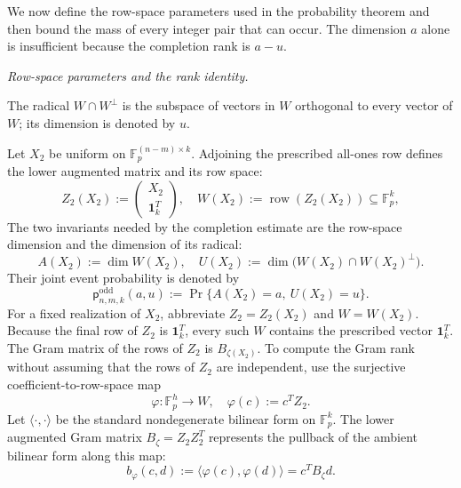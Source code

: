\documentclass[11pt]{article}
\newcommand{\F}{\mathbb F}
\newcommand{\1}{\mathbf 1}
\theoremstyle{plain}
\theoremstyle{definition}
\theoremstyle{remark}
\begin{document}
We now define the row-space parameters used in the probability theorem and
then bound the mass of every integer pair that can occur.  The dimension $a$
alone is insufficient because the completion rank is $a-u$.

\medskip\noindent\emph{Row-space parameters and the rank identity.}\par
The radical $W\cap W^\perp$ is the subspace of vectors in $W$ orthogonal to every vector of $W$; its dimension is denoted by $u$.

Let $X_2$ be uniform on $\F_p^{(n-m)\times k}$.  Adjoining the prescribed
all-ones row defines the lower augmented matrix and its row space:
\begin{equation}
 Z_2(X_2):=\begin{pmatrix}X_2\\\1_k^T\end{pmatrix},
 \quad
 W(X_2):=\operatorname{row}(Z_2(X_2))\subseteq\F_p^k,
 \label{eq:random-unreported-row-space}
\end{equation}
The two invariants needed by the completion estimate are the row-space
dimension and the dimension of its radical:
\begin{equation}
 A(X_2):=\dim W(X_2),
 \quad
 U(X_2):=\dim\bigl(W(X_2)\cap W(X_2)^\perp\bigr).
 \label{eq:a-u-definitions}
\end{equation}
Their joint event probability is denoted by
\begin{equation}
 \mathsf p_{n,m,k}^{\mathrm{odd}}(a,u)
 :=\Pr\{A(X_2)=a,\ U(X_2)=u\}.
 \label{eq:lower-block-class-mass-function}
\end{equation}
For a fixed realization of $X_2$, abbreviate
$Z_2=Z_2(X_2)$ and $W=W(X_2)$.  Because the final row of $Z_2$ is
$\1_k^T$, every such $W$ contains the prescribed vector $\1_k^T$.  The Gram
matrix of the rows of $Z_2$ is $B_{\zeta(X_2)}$.  To compute the Gram rank without assuming that the rows of $Z_2$ are
independent, use the surjective coefficient-to-row-space map
\begin{equation}
 \varphi:\F_p^h\longrightarrow W,
 \quad \varphi(c):=c^TZ_2.
 \label{eq:unreported-row-coefficient-map}
\end{equation}
Let $\langle\cdot,\cdot\rangle$ be the standard nondegenerate bilinear form
on $\F_p^k$.  The lower augmented Gram matrix $B_{\zeta}=Z_2Z_2^T$ represents the pullback
of the ambient bilinear form along this map:
\begin{equation}
 b_{\varphi}(c,d)
 :=\langle\varphi(c),\varphi(d)\rangle
 =c^TB_{\zeta}d.
 \label{eq:unreported-pullback-bilinear-form}
\end{equation}
\end{document}
